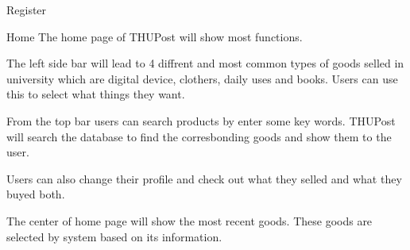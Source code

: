 \documentclass[final]{beamer}
\newlength{\onecolwid}
\begin{document}
\begin{frame}[t]
\begin{columns}[t]
\begin{column}{\onecolwid}
\begin{block}{Register}
        \end{block}
        \begin{block}{Home}
        The home page of THUPost will show most functions. 

        The left side bar will lead to 4 diffrent and most common types of goods selled in university which are digital device, clothers, daily uses and books. Users can use this to select what things they want.

        From the top bar users can search products by enter some key words. THUPost will search the database to find the corresbonding goods and show them to the user.

        Users can also change their profile and check out what they selled and what they buyed both.

        The center of home page will show the most recent goods. These goods are selected by system based on its information.







\end{block}
\end{column}
\end{columns}
\end{frame}
\end{document}
